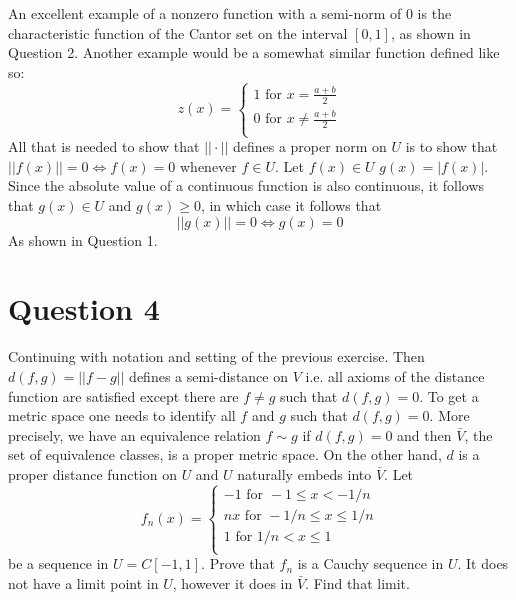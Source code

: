 \documentclass[12pt, letterpaper]{article}
\begin{document}
\noindent An excellent example of a nonzero function with a semi-norm of 0 is the characteristic function of the Cantor set on the interval $[0, 1]$, as shown in Question 2. Another example would be a somewhat similar function defined
like so:
\[
z(x)=
  \begin{cases}
   1 \text{ for } x = \frac{a + b}{2} \\
   0 \text{ for } x \neq \frac{a + b}{2}\\
  \end{cases}
\]
All that is needed to show that $||\cdot||$ defines a proper norm on $U$ is to show that $||f(x)|| = 0 \iff f(x) = 0$ whenever $f \in U$. Let $f(x) \in U$  $g(x) = |f(x)|$. Since the absolute value of a continuous function is also continuous, it follows that $g(x) \in U$ and $g(x) \geq 0$, in which case it follows that
$$||g(x)|| = 0 \iff g(x) = 0$$
As shown in Question 1.
\section*{Question 4}
Continuing with notation and setting of the previous exercise. Then $d(f,g)=||f-g||$ defines a semi-distance on $V$ i.e. all axioms of the distance function are
satisfied except there are $f\neq g$ such that $d(f,g)=0$. To get a metric space one needs to identify all $f$ and $g$ such that $d(f,g)=0$. More precisely,
we have an equivalence relation $f\sim  g$ if $d(f,g)=0$ and then $\bar V$, the set of equivalence classes, is a proper metric space.
 On the other hand, $d$ is a proper distance function on $U$ and $U$ naturally embeds into $\bar V$.  Let
\[
f_n(x)=
 \begin{cases} -1  \text{ for } -1\leq x < -1/n \\
nx  \text{ for } -1/n \leq x \leq 1/n \\
 1   \text{ for } 1/n < x \leq 1 \\
  \end{cases}
\]
be a sequence in $U=C[-1,1]$. Prove that $f_n$ is a Cauchy sequence in $U$. It does not have a limit point in $U$, however it does in $\bar V$. Find that limit.
\end{document}

